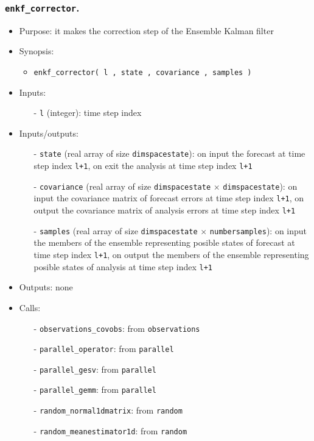 \documentclass[12pt]{article}
\begin{document}
\subsubsection{{\tt enkf\_corrector}.}
\begin{itemize}
\item Purpose: it makes the correction step of the Ensemble Kalman filter
\item Synopsis: 
\begin{itemize}
\item {\tt enkf\_corrector( l , state , covariance , samples )} 
\end{itemize}
\item Inputs: 
\begin{itemize}
\item[-] {\tt l} (integer): time step index
\end{itemize}
\item Inputs/outputs: 
\begin{itemize}
\item[-] {\tt state} (real array of size {\tt dimspacestate}): on input the forecast at time step index {\tt l+1}, on exit the analysis at time step index {\tt l+1}
\item[-] {\tt covariance} (real array of size {\tt dimspacestate} $\times$ {\tt dimspacestate}): on input the covariance matrix of forecast errors at time step index {\tt l+1}, on output the covariance matrix of analysis errors at time step index {\tt l+1}
\item[-] {\tt samples} (real array of size {\tt dimspacestate} $\times$ {\tt numbersamples}): on input the members of the ensemble representing posible states of forecast at time step index {\tt l+1}, on output the members of the ensemble representing posible states of analysis at time step index {\tt l+1}
\end{itemize}
\item Outputs: none
\item Calls: 
\begin{itemize}
\item[-] {\tt observations\_covobs}: from {\tt observations} 
\item[-] {\tt parallel\_operator}: from {\tt parallel} 
\item[-] {\tt parallel\_gesv}: from {\tt parallel} 
\item[-] {\tt parallel\_gemm}: from {\tt parallel} 
\item[-] {\tt random\_normal1dmatrix}: from {\tt random} 
\item[-] {\tt random\_meanestimator1d}: from {\tt random}

\end{itemize}
\end{itemize}
\end{document}
